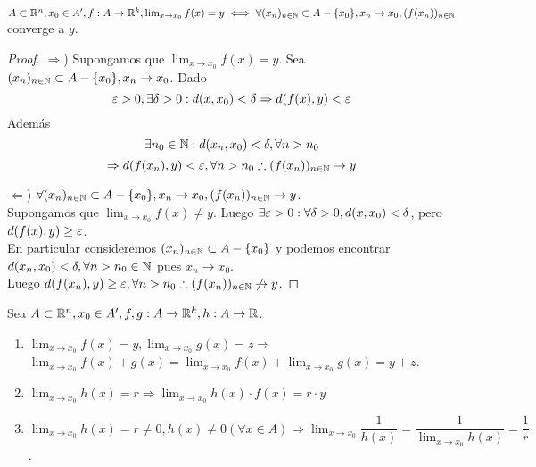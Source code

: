 \begin{prop}
  $A \subset \mathbb{R}^n, x_0 \in A^{\prime}, f: A \to \mathbb{R}^k, \lim_{x \to x_0} f(x) = y \iff \forall (x_n)_{n \in \mathbb{N}} \subset A - \{x_0\}, x_n \to x_0, (f(x_n))_{n \in \mathbb{N}}$ converge a $y$.
  \begin{proof}
    $\Rightarrow$) Supongamos que $\lim_{x \to x_0} f(x) = y$. Sea $(x_n)_{n \in \mathbb{N}} \subset A - \{x_0\}, x_n \to x_0$. Dado \begin{equation}
      \varepsilon > 0, \exists \delta > 0 : d(x, x_0) < \delta \Rightarrow d(f(x), y) < \varepsilon
    \end{equation} Además \begin{equation}
      \exists n_0 \in \mathbb{N} : d(x_n, x_0) < \delta, \forall n > n_0
    \end{equation} \begin{equation} \Rightarrow d(f(x_n), y) < \varepsilon, \forall n > n_0 \therefore (f(x_n))_{n \in \mathbb{N}} \to y \end{equation}

    $\Leftarrow$) $\forall (x_n)_{n \in \mathbb{N}} \subset A - \{x_0\}, x_n \to x_0, (f(x_n))_{n \in \mathbb{N}} \to y$. \\
    Supongamos que $\lim_{x \to x_0} f(x) \neq y$. Luego $\exists \varepsilon > 0 : \forall \delta > 0, d(x, x_0) < \delta$, pero $d(f(x), y) \geq \varepsilon$. \\
    En particular consideremos $(x_n)_{n \in \mathbb{N}} \subset A - \{x_0\}$ y podemos encontrar $d(x_n, x_0) < \delta, \forall n > n_0 \in \mathbb{N}$ pues $x_n \to x_0$. \\
    Luego $d(f(x_n), y) \geq \varepsilon, \forall n > n_0 \therefore (f(x_n))_{n \in \mathbb{N}} \not \to y$.
  \end{proof}
\end{prop}

\begin{prop}
  Sea $A \subset \mathbb{R}^n, x_0 \in A^{\prime}, f, g: A \to \mathbb{R}^k, h: A \to \mathbb{R}$.
  \begin{enumerate}
    \item $\lim_{x \to x_0} f(x) = y, \lim_{x \to x_0} g(x) = z \Rightarrow$ \\ $\lim_{x \to x_0} f(x) + g(x) = \lim_{x \to x_0} f(x) + \lim_{x \to x_0} g(x) = y+z$.
    \item $\lim_{x \to x_0} h(x) = r \Rightarrow \lim_{x \to x_0} h(x) \cdot f(x) = r \cdot y$
    \item $\lim_{x \to x_0} h(x) = r \neq 0, h(x) \neq 0 (\forall x \in A) \Rightarrow \lim_{x \to x_0} \dfrac{1}{h(x)} = \dfrac{1}{\lim_{x \to x_0} h(x)} = \dfrac{1}{r}$.
  \end{enumerate}
\end{prop}

